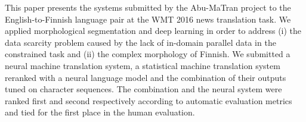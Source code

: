 This paper presents the systems submitted by the Abu-MaTran project to the English-to-Finnish language pair at the WMT 2016 news translation task. We applied morphological segmentation and deep learning in order to address (i) the data scarcity problem caused by the lack of in-domain parallel data in the constrained task and (ii) the complex morphology of Finnish. We submitted a neural machine translation system, a statistical machine translation system reranked with a neural language model and the combination of their outputs tuned on character sequences. The combination and the neural system were ranked first and second respectively according to automatic evaluation metrics and tied for the first place in the human evaluation.
